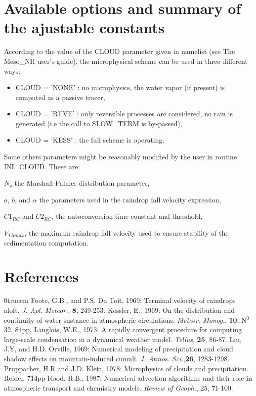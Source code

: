 \section{Available options and summary of the ajustable constants}
According to the value of the CLOUD parameter given in  namelist (see The
Meso\_NH user's guide), the
microphysical scheme can be used in three different ways:
\begin{itemize}
\item
CLOUD = 'NONE' :  no microphysics, the water vapor (if present) is computed
as a passive tracer,
\item
CLOUD = 'REVE' : only reversible processes are considered, no rain is generated
(i.e the call to SLOW\_TERM is by-passed),
\item
CLOUD = 'KESS' : the full scheme is operating.
\end{itemize}

Some others parameters might be reasonably modified  by the user in
routine INI\_CLOUD. These are:

$N_o$ the Marshall-Palmer distribution parameter,

$a$, $b$, and $\alpha$ the parameters used in the raindrop fall velocity
expression,

$C1_{RC}$ and $C2_{RC}$, the autoconversion time constant and threshold,

$V_{TRmax}$, the maximum raindrop fall velocity used to ensure stability of
the sedimentation computation.

\section{References}
\parindent 0truecm
\por
Foote, G.B., and P.S. Du Toit, 1969: Terminal velocity of raindrops aloft.
{\it J. Apl. Meteor.}, {\bf 8}, 249-253.
\por
Kessler, E., 1969: On the distribution and continuity of water sustance in
atmospheric circulations. {\it Meteor. Monog.}, {\bf 10}, N$^0$ 32, 84pp.
\por
Langlois, W.E., 1973: A rapidly convergent procedure for computing large-scale
condensation in a dynamical weather model. {\it Tellus}, {\bf 25}, 86-87.
\por
Liu, J.Y, and H.D. Orville, 1969: Numerical modeling of precipitation and cloud
shadow effects on mountain-induced cumuli. {\it J. Atmos. Sci.},{\bf 26},
1283-1298.
\por
Pruppacher, H.R and J.D. Klett, 1978: Microphysics of clouds and precipitation.
Reidel, 714pp
\por
Rood, R.B., 1987: Numerical advection algorithms and their role in atmospheric
transport and chemistry models. {\it Review of Geoph.}, {25}, 71-100.
